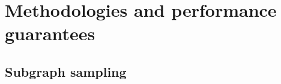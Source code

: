 \section{Methodologies and performance guarantees} \label{sec:alg}

%

\subsection{Subgraph sampling} \label{sec:subgraph}

